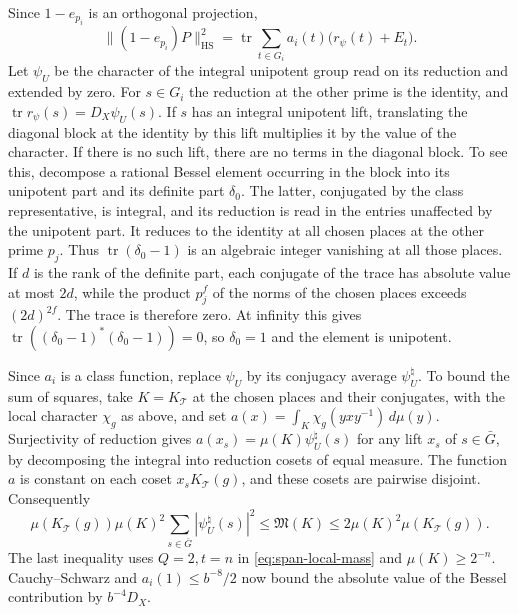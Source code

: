 Since \(1-e_{p_i}\) is an orthogonal projection,
\[
 \|(1-e_{p_i})P\|_{\mathrm{HS}}^2
  =\operatorname{tr}\sum_{t\in G_i} a_i(t)\bigl(r_\psi(t)+E_t\bigr).
\]
Let \(\psi_U\) be the character of the integral unipotent group read on
its reduction and extended by zero. For \(s\in G_i\) the reduction at the
other prime is the identity, and \(\operatorname{tr}r_\psi(s)=D_X\psi_U(s)\).
If \(s\) has an integral unipotent lift, translating the diagonal block at
the identity by this lift multiplies it by the value of the character.
If there is no such lift, there are no terms in the diagonal block.
To see this, decompose a rational Bessel element occurring in the block
into its unipotent part and its definite part \(\delta_0\). The latter,
conjugated by the class representative, is integral, and its reduction
is read in the entries unaffected by the unipotent part. It reduces to
the identity at all chosen places at the other prime \(p_j\).
Thus \(\operatorname{tr}(\delta_0-1)\) is an algebraic integer vanishing
at all those places. If \(d\) is the rank of the definite part, each
conjugate of the trace has absolute value at most \(2d\), while the
product \(p_j^f\) of the norms of the chosen places exceeds \((2d)^{2f}\).
The trace is therefore zero. At infinity this gives
\(\operatorname{tr}((\delta_0-1)^*(\delta_0-1))=0\), so \(\delta_0=1\)
and the element is unipotent.

Since \(a_i\) is a class function, replace \(\psi_U\) by its conjugacy
average \(\psi_U^\natural\). To bound the sum of squares, take
\(K=K_{\mathcal T}\) at the chosen places and their conjugates, with the
local character \(\chi_g\) as above, and set
\(a(x)=\int_K\chi_g(yxy^{-1})\,d\mu(y)\).
Surjectivity of reduction gives \(a(x_s)=\mu(K)\psi_U^\natural(s)\)
for any lift \(x_s\) of \(s\in\bar G\), by decomposing the integral into
reduction cosets of equal measure. The function \(a\) is constant on each
coset \(x_sK_{\mathcal T}(g)\), and these cosets are pairwise disjoint.
Consequently
\[
 \mu(K_{\mathcal T}(g))\mu(K)^2\sum_{s\in\bar G}|\psi_U^\natural(s)|^2
 \le \mathfrak M(K)
 \le 2\mu(K)^2\mu(K_{\mathcal T}(g)).
\]
The last inequality uses \(Q=2,t=n\) in \eqref{eq:span-local-mass} and
\(\mu(K)\ge2^{-n}\). Cauchy--Schwarz and \(a_i(1)\le b^{-8}/2\) now bound
the absolute value of the Bessel contribution by \(b^{-4}D_X\).

